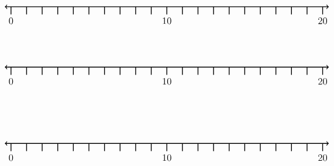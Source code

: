 \documentclass[leqno, 12pt]{article}
\begin{document}
\vspace{10pt}\begin{equation}
    \begin{tikzpicture}[scale=0.67, baseline={([yshift=-1pt]current bounding box.north)}]
        \draw[{To[scale=1.3]}-{To[scale=1.3]}, line width=1pt] (-0.4, 0) -- (20.4, 0);
        \foreach \x in {0,1,...,20}
            \draw[shift={(\x,0)},color=black, line width=1pt] (0pt,-14pt) -- (0pt,0pt);
        \foreach \x in {0,10,20}
            \draw[shift={(\x,-0.8)},color=black] node[font=\large,text height=12pt] {$\x$};
        \node [font=\large, anchor=east] at (25,1.65) {$  $};
    \end{tikzpicture}
\end{equation}
\vspace{10pt}\begin{equation}
    \begin{tikzpicture}[scale=0.67, baseline={([yshift=-1pt]current bounding box.north)}]
        \draw[{To[scale=1.3]}-{To[scale=1.3]}, line width=1pt] (-0.4, 0) -- (20.4, 0);
        \foreach \x in {0,1,...,20}
            \draw[shift={(\x,0)},color=black, line width=1pt] (0pt,-14pt) -- (0pt,0pt);
        \foreach \x in {0,10,20}
            \draw[shift={(\x,-0.8)},color=black] node[font=\large,text height=12pt] {$\x$};
        \node [font=\large, anchor=east] at (25,1.65) {$  $};
    \end{tikzpicture}
\end{equation}
\vspace{10pt}\pagebreak ~ \newline ~ \newline\begin{equation}
    \begin{tikzpicture}[scale=0.67, baseline={([yshift=-1pt]current bounding box.north)}]
        \draw[{To[scale=1.3]}-{To[scale=1.3]}, line width=1pt] (-0.4, 0) -- (20.4, 0);
        \foreach \x in {0,1,...,20}
            \draw[shift={(\x,0)},color=black, line width=1pt] (0pt,-14pt) -- (0pt,0pt);
        \foreach \x in {0,10,20}
            \draw[shift={(\x,-0.8)},color=black] node[font=\large,text height=12pt] {$\x$};
        \node [font=\large, anchor=east] at (25,1.65) {$  $};
    \end{tikzpicture}
\end{equation}
\end{document}
